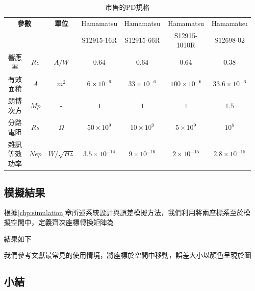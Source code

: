     \begin{table}[h]
        \renewcommand{\arraystretch}{1.3}
        \setlength{\arrayrulewidth}{0.15mm}
        \setlength{\doublerulesep}{0.12mm}
        \caption{市售的PD規格\cite{datasheet:hm_pd}}
        \label{tab:para_PD}
        \centering
        \begin{tabular}{|cc|c|| c|c|c|c|}
        \hline
        \multicolumn{2}{|c|}{\textbf{參數}} & \textbf{單位}  
        & {Hamamatsu}&{Hamamatsu} &{Hamamatsu} &{Hamamatsu}  \\
        \multicolumn{2}{|c|}{} & {}  
        & {S12915-16R}& {S12915-66R}& {S12915-1010R}& {S12698-02}
        \\
        \hline
        響應率 &$Re$ & $A/W$ & 0.64& 0.64& 0.64& 0.38 \\
        有效面積& $A$& $m^2$ & 
        $6\times 10^{-6}$ & 
        $33\times 10^{-6}$ & 
        $100\times 10^{-6}$ & 
        $33.6\times 10^{-6}$\\
        朗博次方& $Mp$& -  & $1$& $1$& $1$& $1.5$\\
        分路電阻 &$Rs$ & $\Omega$ 
        & $50\times 10^{9}$ 
        & $10\times 10^{9}$
        & $5\times 10^{9}$
        & $10^{8}$  \\
        雜訊等效功率 &$Nep$ & $W/\sqrt{Hz}$ 
        & $3.5\times 10^{-14}$ 
        & $9\times 10^{-16}$
        & $2\times 10^{-15}$
        & $2.8\times 10^{-15}$\\
        \hline
        \end{tabular}
        \end{table}



\subsection{模擬結果}
\label{chp:simulate_result_sub}

根據\ref{chp:simulation}章所述系統設計與誤差模擬方法，我們利用將兩座標系至於模擬空間中，定義齊次座標轉換矩陣為

結果如下



我們參考文獻最常見的使用情境，將座標於空間中移動，誤差大小以顏色呈現於圖

\subsection{小結}

